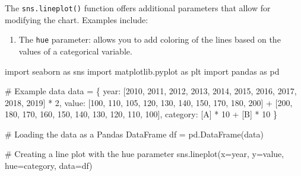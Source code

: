 \documentclass[
  english,
  letterpaper,
  DIV=11,
  numbers=noendperiod]{scrreprt}
\newenvironment{Shaded}{\begin{snugshade}}{\end{snugshade}}
\newcommand{\CommentTok}[1]{\textcolor[rgb]{0.37,0.37,0.37}{#1}}
\newcommand{\DecValTok}[1]{\textcolor[rgb]{0.68,0.00,0.00}{#1}}
\newcommand{\ImportTok}[1]{\textcolor[rgb]{0.00,0.46,0.62}{#1}}
\newcommand{\NormalTok}[1]{\textcolor[rgb]{0.00,0.23,0.31}{#1}}
\newcommand{\OperatorTok}[1]{\textcolor[rgb]{0.37,0.37,0.37}{#1}}
\newcommand{\StringTok}[1]{\textcolor[rgb]{0.13,0.47,0.30}{#1}}
\providecommand{\tightlist}{%
  \setlength{\itemsep}{0pt}\setlength{\parskip}{0pt}}
\begin{document}
The \texttt{sns.lineplot()} function offers additional parameters that
allow for modifying the chart. Examples include:

\begin{enumerate}
\def\labelenumi{\arabic{enumi}.}
\tightlist
\item
  The \texttt{hue} parameter: allows you to add coloring of the lines
  based on the values of a categorical variable.
\end{enumerate}

\begin{Shaded}
\begin{Highlighting}[]
\ImportTok{import}\NormalTok{ seaborn }\ImportTok{as}\NormalTok{ sns}
\ImportTok{import}\NormalTok{ matplotlib.pyplot }\ImportTok{as}\NormalTok{ plt}
\ImportTok{import}\NormalTok{ pandas }\ImportTok{as}\NormalTok{ pd}

\CommentTok{\# Example data}
\NormalTok{data }\OperatorTok{=}\NormalTok{ \{}
    \StringTok{\textquotesingle{}year\textquotesingle{}}\NormalTok{: [}\DecValTok{2010}\NormalTok{, }\DecValTok{2011}\NormalTok{, }\DecValTok{2012}\NormalTok{, }\DecValTok{2013}\NormalTok{, }\DecValTok{2014}\NormalTok{, }\DecValTok{2015}\NormalTok{, }\DecValTok{2016}\NormalTok{, }\DecValTok{2017}\NormalTok{, }\DecValTok{2018}\NormalTok{, }\DecValTok{2019}\NormalTok{] }\OperatorTok{*} \DecValTok{2}\NormalTok{,}
    \StringTok{\textquotesingle{}value\textquotesingle{}}\NormalTok{: [}\DecValTok{100}\NormalTok{, }\DecValTok{110}\NormalTok{, }\DecValTok{105}\NormalTok{, }\DecValTok{120}\NormalTok{, }\DecValTok{130}\NormalTok{, }\DecValTok{140}\NormalTok{, }\DecValTok{150}\NormalTok{, }\DecValTok{170}\NormalTok{, }\DecValTok{180}\NormalTok{, }\DecValTok{200}\NormalTok{] }\OperatorTok{+}
\NormalTok{             [}\DecValTok{200}\NormalTok{, }\DecValTok{180}\NormalTok{, }\DecValTok{170}\NormalTok{, }\DecValTok{160}\NormalTok{, }\DecValTok{150}\NormalTok{, }\DecValTok{140}\NormalTok{, }\DecValTok{130}\NormalTok{, }\DecValTok{120}\NormalTok{, }\DecValTok{110}\NormalTok{, }\DecValTok{100}\NormalTok{],}
    \StringTok{\textquotesingle{}category\textquotesingle{}}\NormalTok{: [}\StringTok{\textquotesingle{}A\textquotesingle{}}\NormalTok{] }\OperatorTok{*} \DecValTok{10} \OperatorTok{+}\NormalTok{ [}\StringTok{\textquotesingle{}B\textquotesingle{}}\NormalTok{] }\OperatorTok{*} \DecValTok{10}
\NormalTok{\}}

\CommentTok{\# Loading the data as a Pandas DataFrame}
\NormalTok{df }\OperatorTok{=}\NormalTok{ pd.DataFrame(data)}

\CommentTok{\# Creating a line plot with the \textquotesingle{}hue\textquotesingle{} parameter}
\NormalTok{sns.lineplot(x}\OperatorTok{=}\StringTok{\textquotesingle{}year\textquotesingle{}}\NormalTok{, y}\OperatorTok{=}\StringTok{\textquotesingle{}value\textquotesingle{}}\NormalTok{, hue}\OperatorTok{=}\StringTok{\textquotesingle{}category\textquotesingle{}}\NormalTok{, data}\OperatorTok{=}\NormalTok{df)}


\end{Highlighting}
\end{Shaded}
\end{document}
